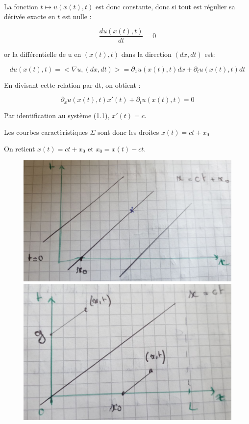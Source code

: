 La fonction $t\mapsto u(x(t), t)$ est donc constante, donc si tout est r\'egulier sa d\'eriv\'ee exacte en $t$ est nulle :

$$\frac{du(x(t),t)}{dt} = 0$$ 

or la diff\'erentielle de u en $(x(t),t)$ dans la direction $(dx,dt)$ est:

$$ du(x(t),t) = <\nabla u ,(dx,dt)> = \partial_x u(x(t),t)dx+ \partial_t u(x(t), t)dt$$

En divisant cette relation par dt, on obtient :

$$\partial_x u(x(t),t)x'(t)+ \partial_t u(x(t), t)=0$$

Par identification au syst\`eme (1.1), $x'(t)=c$.

Les courbes caract\`eristiques $\Sigma$ sont donc les droites $x(t) = ct+x_0$

On retient $x(t) = ct+x_0$ et $x_0 = x(t)-ct$. 

\begin{figure}[h!]
	\centering \includegraphics[scale=0.205]{Images_Fichiers/Y2.png}
	\centering \includegraphics[scale=0.22]{Images_Fichiers/Y3.png}
\end{figure}

